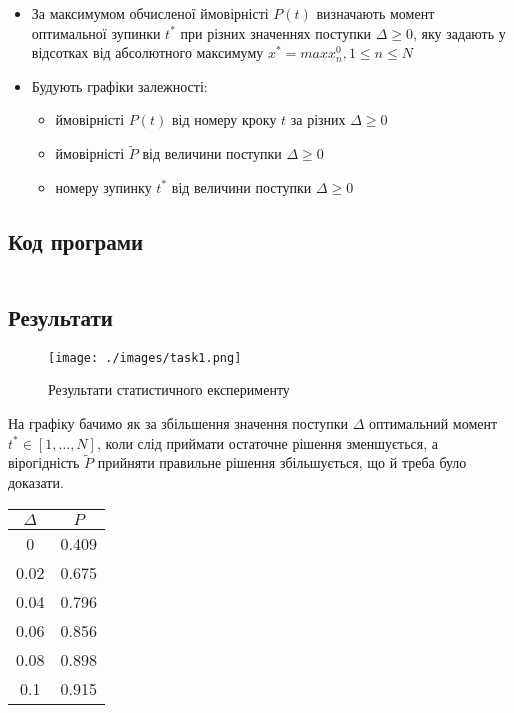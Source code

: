 \begin{itemize}
      \item За максимумом обчисленої ймовірністі $P(t)$ визначають момент
            оптимальної зупинки $t^*$ при різних значеннях поступки $\Delta \geq 0$,
            яку задають у відсотках від абсолютного максимуму
            $x^* = max x_n^0, 1 \leq n \leq N$
      \item Будують графіки залежності:
            \begin{itemize}
                  \item ймовірністі $P(t)$ від номеру кроку $t$ за різних $\Delta \geq 0$
                  \item ймовірністі $\widetilde{P}$ від величини поступки $\Delta \geq 0$
                  \item номеру зупинку $t^*$ від величини поступки $\Delta \geq 0$
            \end{itemize}
\end{itemize}

\subsection{Код програми}
\label{subsec:task1_code}
\inputminted{python}{../src/task1.py}

\subsection{Результати}
\label{subsec:task1_results}

\begin{figure}[!ht]
      \centering
      \texttt{[image: ./images/task1.png]}
      \caption{Результати статистичного експерименту}
      \label{fig:graphs}
\end{figure}

На графіку бачимо як за збільшення значення поступки $\Delta$
оптимальний момент $t^* \in [1, \dots, N]$, коли слід приймати остаточне рішення
зменшується, а вірогідність $\widetilde{P}$ прийняти правильне рішення збільшується,
що й треба було доказати.

\begin{tabular}{|c|c|}
      \toprule
      $\Delta$ & $P$   \\

      \midrule
      0        & 0.409 \\
      \hline
      0.02     & 0.675 \\
      \hline
      0.04     & 0.796 \\
      \hline
      0.06     & 0.856 \\
      \hline
      0.08     & 0.898 \\
      \hline
      0.1      & 0.915 \\

      \bottomrule
\end{tabular}
